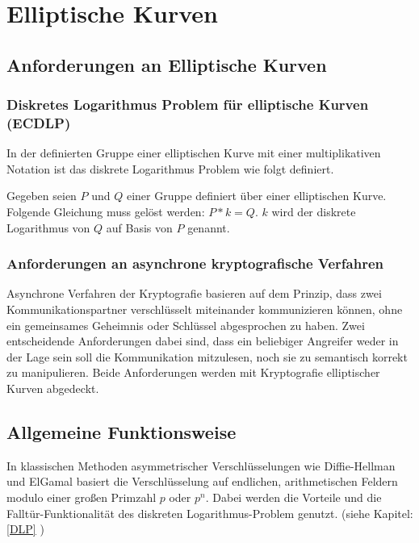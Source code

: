 
\chapter{Elliptische Kurven}

\section{Anforderungen an Elliptische Kurven}


\subsection{Diskretes Logarithmus Problem für elliptische Kurven (ECDLP)}
In der definierten Gruppe einer elliptischen Kurve mit einer multiplikativen Notation
ist das diskrete Logarithmus Problem wie folgt definiert.

Gegeben seien $P$ und $Q$ einer Gruppe definiert über einer elliptischen Kurve.
Folgende Gleichung muss gelöst werden: $ P*k = Q $. $k$ wird der diskrete Logarithmus von $Q$
auf Basis von $P$ genannt.

\subsection{Anforderungen an asynchrone kryptografische Verfahren}

Asynchrone Verfahren der Kryptografie basieren auf dem Prinzip, dass zwei Kommunikationspartner verschlüsselt miteinander kommunizieren können, ohne ein gemeinsames Geheimnis oder Schlüssel abgesprochen zu haben. Zwei entscheidende Anforderungen dabei sind, dass ein beliebiger Angreifer weder in der Lage sein soll die Kommunikation mitzulesen, noch sie zu semantisch korrekt zu manipulieren.
Beide Anforderungen werden mit Kryptografie elliptischer Kurven abgedeckt.

\newpage

\section{Allgemeine Funktionsweise} \label{ECC_DLP}

In klassischen Methoden asymmetrischer Verschlüsselungen wie Diffie-Hellman und ElGamal basiert die
Verschlüsselung auf endlichen, arithmetischen Feldern modulo einer großen Primzahl $p$ oder $p^n$.
Dabei werden die Vorteile und die Falltür-Funktionalität des diskreten Logarithmus-Problem genutzt.
(siehe Kapitel: \ref{DLP} )

